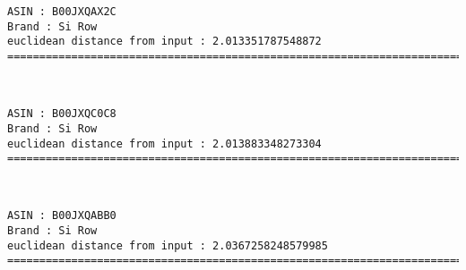 \documentclass[11pt]{article}
\begin{document}
    \begin{Verbatim}[commandchars=\\\{\}]
ASIN : B00JXQAX2C
Brand : Si Row
euclidean distance from input : 2.013351787548872
=============================================================================================================================

    \end{Verbatim}

    
    
    \begin{center}
    \end{center}
    { \hspace*{\fill} \\}
    
    \begin{Verbatim}[commandchars=\\\{\}]
ASIN : B00JXQC0C8
Brand : Si Row
euclidean distance from input : 2.013883348273304
=============================================================================================================================

    \end{Verbatim}

    
    
    \begin{center}
    \end{center}
    { \hspace*{\fill} \\}
    
    \begin{Verbatim}[commandchars=\\\{\}]
ASIN : B00JXQABB0
Brand : Si Row
euclidean distance from input : 2.0367258248579985
=============================================================================================================================

    \end{Verbatim}

    
    
    \begin{center}
    \end{center}
    { \hspace*{\fill} \\}
    
\end{document}

